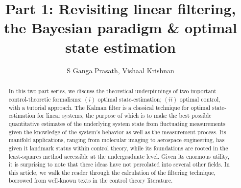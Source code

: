 \documentclass{resonance}
\begin{document}
\title{Part 1: Revisiting linear filtering, the Bayesian paradigm \& optimal state estimation}
\author{S Ganga Prasath, Vishaal Krishnan}

\maketitle


\begin{abstract}
In this two part series, we discuss the theoretical underpinnings of two important control-theoretic formalisms: $(i)$ optimal state-estimation; $(ii)$ optimal control, with a tutorial approach. The Kalman filter is a classical technique for optimal state-estimation for linear systems, the purpose of which is to make the best possible quantitative estimates of the underlying system state from fluctuating measurements given the knowledge of the system's behavior as well as the measurement process. Its manifold applications, ranging from molecular imaging to aerospace engineering, has given it landmark status within control theory, while its foundations are rooted in the least-squares method accessible at the undergraduate level. Given its enormous utility, it is surprising to note that these ideas have not percolated into several other fields. In this article, we walk the reader through the calculation of the filtering technique, borrowed from well-known texts in the control theory literature.
\end{abstract}
\end{document}
